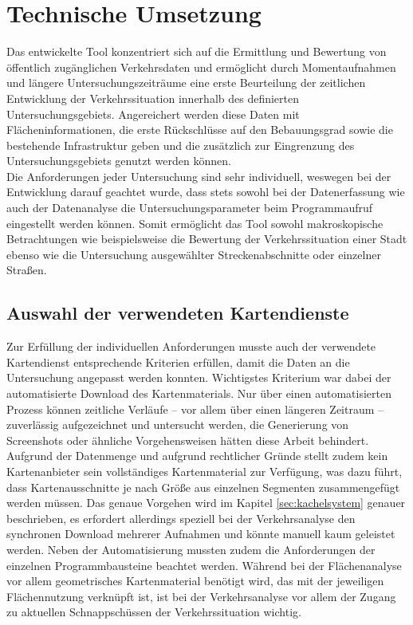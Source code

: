 \section{Technische Umsetzung}
\label{sec:technische_umsetzung}

Das entwickelte Tool konzentriert sich auf die Ermittlung und Bewertung von öffentlich zugänglichen Verkehrsdaten und ermöglicht durch Momentaufnahmen und längere Untersuchungszeiträume eine erste Beurteilung der zeitlichen Entwicklung der Verkehrssituation innerhalb des definierten Untersuchungsgebiets. Angereichert werden diese Daten mit Flächeninformationen, die erste Rückschlüsse auf den Bebauungsgrad sowie die bestehende Infrastruktur geben und die zusätzlich zur Eingrenzung des Untersuchungsgebiets genutzt werden können.\\

Die Anforderungen jeder Untersuchung sind sehr individuell, weswegen bei der Entwicklung darauf geachtet wurde, dass stets sowohl bei der Datenerfassung wie auch der Datenanalyse die Untersuchungsparameter beim Programmaufruf eingestellt werden können. Somit ermöglicht das Tool sowohl makroskopische Betrachtungen wie beispielsweise die Bewertung der Verkehrssituation einer Stadt ebenso wie die Untersuchung ausgewählter Streckenabschnitte oder einzelner Straßen.\\

\subsection{Auswahl der verwendeten Kartendienste}
\label{sec:kartendienste}

Zur Erfüllung der individuellen Anforderungen musste auch der verwendete Kartendienst entsprechende Kriterien erfüllen, damit die Daten an die Untersuchung angepasst werden konnten.  Wichtigstes Kriterium war dabei der automatisierte Download des Kartenmaterials. Nur über einen automatisierten Prozess können zeitliche Verläufe -- vor allem über einen längeren Zeitraum -- zuverlässig aufgezeichnet und untersucht werden, die Generierung von Screenshots oder ähnliche Vorgehensweisen hätten diese Arbeit behindert. Aufgrund der Datenmenge und aufgrund rechtlicher Gründe stellt zudem kein Kartenanbieter sein vollständiges Kartenmaterial zur Verfügung, was dazu führt, dass Kartenausschnitte je nach Größe aus einzelnen Segmenten zusammengefügt werden müssen. Das genaue Vorgehen wird im Kapitel \ref{sec:kachelsystem} genauer beschrieben, es erfordert allerdings speziell bei der Verkehrsanalyse den synchronen Download mehrerer Aufnahmen und könnte manuell kaum geleistet werden. Neben der Automatisierung mussten zudem die Anforderungen der einzelnen Programmbausteine beachtet werden. Während bei der Flächenanalyse vor allem geometrisches Kartenmaterial benötigt wird, das mit der jeweiligen Flächennutzung verknüpft ist, ist bei der Verkehrsanalyse vor allem der Zugang zu aktuellen Schnappschüssen der Verkehrssituation wichtig.\\

